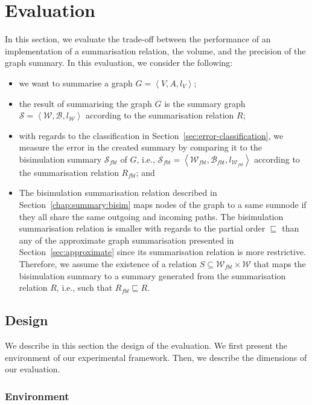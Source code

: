 \section{Evaluation}
\label{sec:eval}

In this section, we evaluate the trade-off between the performance of an implementation of a summarisation relation, the volume, and the precision of the graph summary.
In this evaluation, we consider the following:
\begin{itemize}
	\item we want to summarise a graph $G=\left\langle V, A, l_V \right\rangle$;
	\item the result of summarising the graph $G$ is the summary graph $\mathcal{S} = \left\langle \mathcal{W}, \mathcal{B}, l_{\mathcal{W}} \right\rangle$ according to the summarisation relation $R$;
	\item with regards to the classification in Section~\ref{sec:error-classification}, we measure the error in the created summary by comparing it to the bisimulation summary $\mathcal{S}_{fbt}$ of $G$, i.e., $\mathcal{S}_{fbt} = \left\langle \mathcal{W}_{fbt}, \mathcal{B}_{fbt}, l_{\mathcal{W}_{fbt}} \right\rangle$ according to the summarisation relation $R_{fbt}$; and
	\item The bisimulation summarisation relation described in Section~\ref{chap:summary:bisim} maps nodes of the graph to a same sumnode if they all share the same outgoing and incoming paths. The bisimulation summarisation relation is smaller with regards to the partial order $\sqsubseteq$ than any of the approximate graph summarisation presented in Section~\ref{sec:approximate} since its summarisation relation is more restrictive. Therefore, we assume the existence of a relation $S \subseteq \mathcal{W}_{fbt} \times \mathcal{W}$ that maps the bisimulation summary to a summary generated from the summarisation relation $R$, i.e., such that $R_{fbt} \sqsubseteq R$.
\end{itemize}

\subsection{Design}
\label{sec:eval:design}

We describe in this section the design of the evaluation. We first present the environment of our experimental framework. Then, we describe the dimensions of our evaluation.

\subsubsection{Environment}

